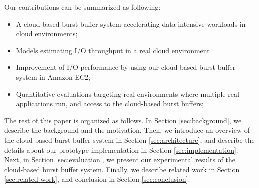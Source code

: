 Our contributions can be summarized as following:
\begin{itemize}
	\item A cloud-based burst buffer system accelerating data intensive
	workloads in cloud environments;
	\item Models estimating I/O throughput in a real cloud environment
	\item Improvement of I/O performance by using our cloud-based burst buffer
	system in Amazon EC2;
    \item Quantitative evaluations targeting real environments where
    multiple real applications run, and access to the cloud-based burst
    buffers;
\end{itemize}
\par
The rest of this paper is organized as follows. 
In Section \ref{sec:background}, we describe the background and the motivation.
Then, we introduce an overview of the cloud-based burst buffer system in Section \ref{sec:architecture}, 
and describe the details about our prototype implementation in Section \ref{sec:implementation}.
Next, in Section \ref{sec:evaluation}, we present our experimental results
of the cloud-based burst buffer system.
Finally, we describe related work in Section \ref{sec:related work}, and
conclusion in Section \ref{sec:conclusion}.
